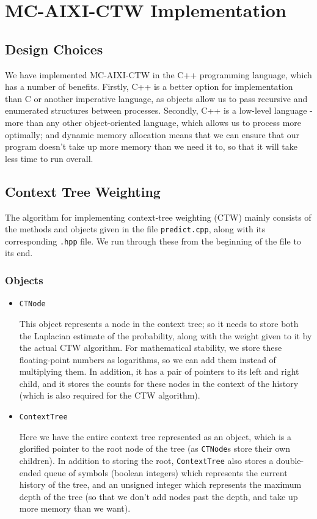 \documentclass[pdftex,twoside,a4paper]{report}
\begin{document}
\chapter{MC-AIXI-CTW Implementation}
\section{Design Choices}

We have implemented MC-AIXI-CTW in the C++ programming language, which has a number of benefits. Firstly, C++ is a better option for implementation than C or another imperative language, as objects allow us to pass recursive and enumerated structures between processes. Secondly, C++ is a low-level language - more than any other object-oriented language, which allows us to process more optimally; and dynamic memory allocation means that we can ensure that our program doesn't take up more memory than we need it to, so that it will take less time to run overall.

\section{Context Tree Weighting}
The algorithm for implementing context-tree weighting (CTW) mainly consists of the methods and objects given in the file \texttt{predict.cpp}, along with its corresponding \texttt{.hpp} file. We run through these from the beginning of the file to its end.  

\subsection{Objects}
\begin{itemize}
\item{\texttt{CTNode}

This object represents a node in the context tree; so it needs to store both the Laplacian estimate of the probability, along with the weight given to it by the actual CTW algorithm. For mathematical stability, we store these floating-point numbers as logarithms, so we can add them instead of multiplying them. In addition, it has a pair of pointers to its left and right child, and it stores the counts for these nodes in the context of the history (which is also required for the CTW algorithm).
  }
\item{\texttt{ContextTree}

Here we have the entire context tree represented as an object, which is a glorified pointer to the root node of the tree (as \texttt{CTNode}s store their own children). In addition to storing the root, \texttt{ContextTree} also stores a double-ended queue of symbols (boolean integers) which represents the current history of the tree, and an unsigned integer which represents the maximum depth of the tree (so that we don't add nodes past the depth, and take up more memory than we want).
  }
\end{itemize}
\end{document}

